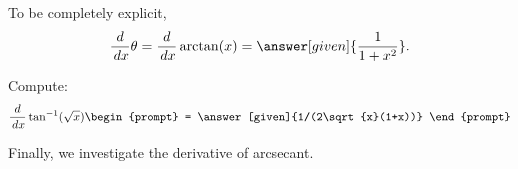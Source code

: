 \documentclass{ximera}
\begin{document}
\begin{theorem}
\begin{explanation}
To be completely explicit, 
\[
\ddx \theta = \ddx \arctan(x) = \answer[given]{\frac{1}{1+x^2}}.
\]
\end{explanation}
\end{theorem}

\begin{question}
  Compute:
  \[
  \ddx \tan^{-1}(\sqrt{x})
  \begin{prompt}
    = \answer[given]{1/(2\sqrt{x}(1+x))}
  \end{prompt}
  \]
\end{question}



Finally, we investigate the derivative of arcsecant.
\end{document}

